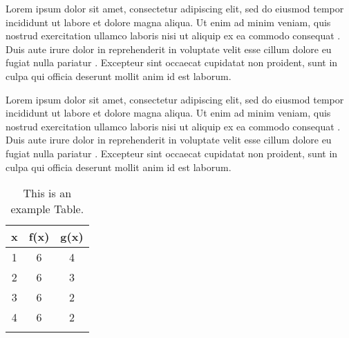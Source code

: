 Lorem ipsum dolor sit amet, consectetur adipiscing elit, sed do eiusmod tempor incididunt ut labore et dolore magna aliqua. Ut enim ad minim veniam, quis nostrud exercitation ullamco laboris nisi ut aliquip ex ea commodo consequat \cite{ref1}. Duis aute irure dolor in reprehenderit in voluptate velit esse cillum dolore eu fugiat nulla pariatur \cite{ref2}. Excepteur sint occaecat cupidatat non proident, sunt in culpa qui officia deserunt mollit anim id est laborum.

Lorem ipsum dolor sit amet, consectetur adipiscing elit, sed do eiusmod tempor incididunt ut labore et dolore magna aliqua. Ut enim ad minim veniam, quis nostrud exercitation ullamco laboris nisi ut aliquip ex ea commodo consequat \cite{ref1}. Duis aute irure dolor in reprehenderit in voluptate velit esse cillum dolore eu fugiat nulla pariatur \cite{ref2}. Excepteur sint occaecat cupidatat non proident, sunt in culpa qui officia deserunt mollit anim id est laborum.


\begin{table}
\caption{This is an example Table.}
\begin{center}
\begin{tabular}{ccc}
x & f(x) & g(x) \\
\hline
1 & 6 & 4  \\
2 & 6 & 3  \\
3 & 6 & 2  \\
4 & 6 & 2  \\
\label{Table in Chapter 1}
\end{tabular}
\end{center}
\end{table}
